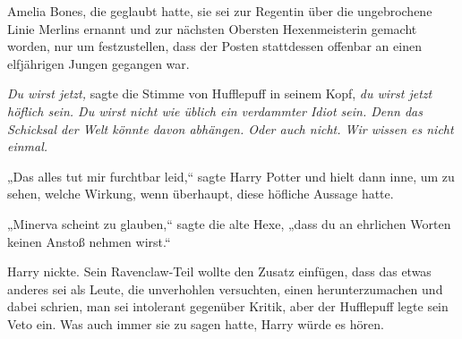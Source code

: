 Amelia Bones, die geglaubt hatte, sie sei zur Regentin über die ungebrochene Linie Merlins ernannt und zur nächsten Obersten Hexenmeisterin gemacht worden, nur um festzustellen, dass der Posten stattdessen offenbar an einen elfjährigen Jungen gegangen war.

\emph{Du wirst jetzt,} sagte die Stimme von Hufflepuff in seinem Kopf, \emph{du wirst jetzt höflich sein. Du wirst nicht wie üblich ein verdammter Idiot sein. Denn das Schicksal der Welt könnte davon abhängen. Oder auch nicht. Wir wissen es nicht einmal.}

„Das alles tut mir furchtbar leid,“ sagte Harry Potter und hielt dann inne, um zu sehen, welche Wirkung, wenn überhaupt, diese höfliche Aussage hatte.

„Minerva scheint zu glauben,“ sagte die alte Hexe, „dass du an ehrlichen Worten keinen Anstoß nehmen wirst.“

Harry nickte.
Sein Ravenclaw-Teil wollte den Zusatz einfügen, dass das etwas anderes sei als Leute, die unverhohlen versuchten, einen herunterzumachen und dabei schrien, man sei intolerant gegenüber Kritik, aber der Hufflepuff legte sein Veto ein. Was auch immer sie zu sagen hatte, Harry würde es hören.

